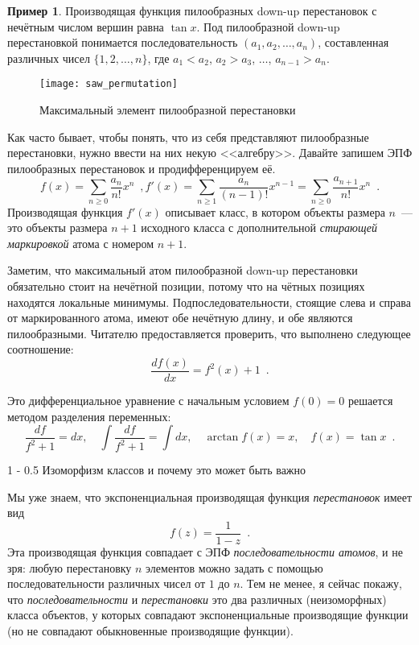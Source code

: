 \documentclass[a5paper]{article}
\makeatletter
\theoremstyle{definition}
\newtheorem{example}{Пример}
\renewcommand{\section}{\@startsection
{section}%
{1}%
{\z@}%
{-\baselineskip}%
{0.5\baselineskip}%
{\centering\large\scshape}} %
\makeatother
\begin{document}
\begin{example}
Производящая функция пилообразных down-up перестановок с нечётным числом вершин 
равна \( \tan x \). Под пилообразной down-up перестановкой понимается 
последовательность \( (a_1, a_2, \ldots, a_n) \), составленная различных чисел 
\( \{ 1, 2, \ldots, n \} \), где \( a_1 < a_2 \), \( a_2 > a_3 \), \( \ldots 
\), \( a_{n-1} > a_n \).

\begin{figure}[h]
\centering
	\texttt{[image: saw\_permutation]}
\caption{Максимальный элемент пилообразной перестановки}
\label{fig:saw_permutations}	
\end{figure}
	
Как часто бывает, чтобы понять, что из себя представляют пилообразные 
перестановки, нужно ввести на них некую <<алгебру>>. Давайте запишем ЭПФ 
пилообразных перестановок и продифференцируем её.
\[
	f(x) = \sum_{n \geq 0} \dfrac{a_n}{n!} x^n \enspace ,
	f'(x) = \sum_{n \geq 1} \dfrac{a_n}{(n-1)!} x^{n-1} = \sum_{n \geq 0} 
	\dfrac{a_{n+1}}{n!}x^{n}\enspace .
\]
Производящая функция \( f'(x) \) описывает класс, в котором объекты размера \( 
n \)~--- это объекты размера \( n+1 \) исходного класса с дополнительной 
\textit{стирающей маркировкой} атома с номером \( n+1 \). 

Заметим, что максимальный атом пилообразной down-up перестановки обязательно 
стоит на нечётной позиции, потому что на чётных позициях находятся локальные 
минимумы. Подпоследовательности, стоящие слева и справа от маркированного 
атома, имеют обе нечётную длину, и обе являются пилообразными. Читателю 
предоставляется проверить, что выполнено следующее соотношение:
\[
	\dfrac{df(x)}{dx} = f^2(x) + 1 \enspace .
\]
\end{example}
Это дифференциальное уравнение с начальным условием \( f(0) = 0 \) решается 
методом разделения переменных:
\[
	\dfrac{df}{f^2 + 1} = dx, \quad
	\int \dfrac{df}{f^2 + 1} = \int dx, \quad
	\arctan f(x) = x, \quad
	f(x) = \tan x \enspace .
\]

\section{Изоморфизм классов и почему это может быть важно}

Мы уже знаем, что экспоненциальная производящая функция \textit{перестановок} 
имеет вид
\[
	f(z) = \dfrac{1}{1 - z} \enspace .
\]
Эта производящая функция совпадает с ЭПФ \textit{последовательности атомов}, и 
не зря: любую перестановку \( n \) элементов можно задать с помощью 
последовательности различных чисел от \( 1 \) до \( n \). Тем не менее, я 
сейчас покажу, что \textit{последовательности} и \textit{перестановки} это два 
различных (неизоморфных) класса объектов, у которых совпадают экспоненциальные 
производящие функции (но не совпадают обыкновенные производящие функции).
\end{document}
